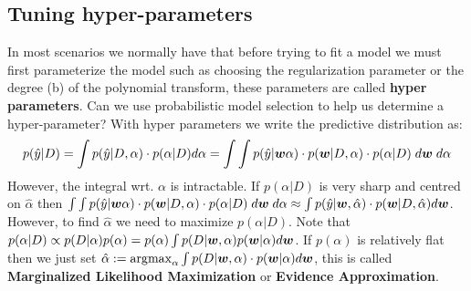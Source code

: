 \subsection{Tuning hyper-parameters}
In most scenarios we normally have that before trying to fit a model we must first parameterize the model such as choosing the regularization parameter or the degree (b) of the polynomial transform, these parameters are called \textbf{hyper parameters}. Can we use probabilistic model selection to help us determine a hyper-parameter? With hyper parameters we write the predictive distribution as: 
\begin{equation}
    p(\hat{y} |D) = \int p(\hat{y} |D ,\alpha)\cdot p(\alpha|D) d\alpha = \int \int p(\hat{y} | \bm{w} \alpha) \cdot p(\bm{w} | D,\alpha) \cdot p(\alpha|D) \; d\bm{w} \; d\alpha
\end{equation}
However, the integral wrt. $\alpha$ is intractable. If $p(\alpha | D)$ is very sharp and centred on $\hat{\alpha}$ then $\int \int p(\hat{y} | \bm{w} \alpha) \cdot p(\bm{w} | D,\alpha) \cdot p(\alpha|D) \; d\bm{w} \; d\alpha \approx \int p(\hat{y} | \bm{w}, \hat{\alpha}) \cdot p(\bm{w} | D, \hat{\alpha}) d\bm{w}$. However, to find $\hat{\alpha}$ we need to maximize $p(\alpha|D)$. Note that $p(\alpha|D) \propto p(D|\alpha) p(\alpha) = p(\alpha) \int p(D| \bm{w}, \alpha) p(\bm{w} | \alpha) d\bm{w}$. If $p(\alpha)$ is relatively flat then we just set $\hat{\alpha} := \operatorname*{arg\!\max}_{\alpha} \int p(D|\bm{w},\alpha) \cdot p(\bm{w} | \alpha) d\bm{w}$, this is called \textbf{Marginalized Likelihood Maximization} or \textbf{Evidence Approximation}.

